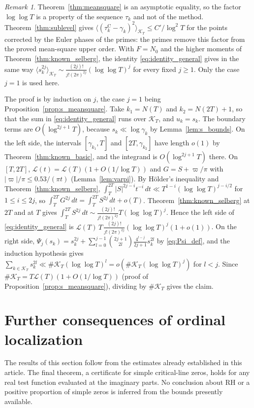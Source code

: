\documentclass[11pt,a4paper]{article}
\makeatletter
\numberwithin{equation}{section}
\DeclareRobustCommand{\CGref}[1]{\ref{#1}}
\DeclareRobustCommand{\CGeqref}[1]{\eqref{#1}}
\let\CG@origref\ref
\let\CG@origeqref\eqref
\newcommand{\CG@gettip}[1]{\@ifundefined{CGTip@#1}{#1}{\csname CGTip@#1\endcsname}}
\DeclareRobustCommand{\CGref}[1]{\pdftooltip{\CG@origref{#1}}{\CG@gettip{#1}}}
\DeclareRobustCommand{\CGeqref}[1]{\pdftooltip{\CG@origeqref{#1}}{\CG@gettip{#1}}}
\theoremstyle{definition}
\theoremstyle{remark}
\newtheorem{remark}[theorem]{Remark}
\newcommand{\Nz}{N_0} %
\newcommand{\lL}{\mathcal L}
\newcommand{\Kc}{\mathcal K}
\makeatother
\begin{document}
\begin{remark}\label{rem:meansquare_comparison}
Theorem~\CGref{thm:meansquare} is an asymptotic equality, so the factor $\log\log T$ is a property of the sequence $\tau_k$ and not of the method. Theorem~\CGref{thm:sublevel} gives $\langle(\tau_{k}^{\mathrm C}-\gamma_k)^2\rangle_{\Kc_T}\le C'/\log^2T$ for the points corrected by the Euler phases of the primes: the primes remove this factor from the proved mean-square upper order. With $F=\Nz$ and the higher moments of Theorem~\CGref{thm:known_selberg}, the identity \CGeqref{eq:identity_general} gives in the same way $\langle s_k^{2j}\rangle_{\Kc_T}\sim\frac{(2j)!}{j!(2\pi)^{2j}}(\log\log T)^j$ for every fixed $j\ge1$. Only the case $j=1$ is used here.

The proof is by induction on $j$, the case $j=1$ being Proposition~\CGref{prop:s_meansquare}. Take $k_1=N(T)$ and $k_2=N(2T)+1$, so that the sum in \CGeqref{eq:identity_general} runs over $\Kc_T$, and $u_k=s_k$. The boundary terms are $O(\log^{2j+1}T)$, because $s_k\ll\log\gamma_k$ by Lemma~\CGref{lem:s_bounds}. On the left side, the intervals $[\gamma_{k_1},T]$ and $[2T,\gamma_{k_2}]$ have length $o(1)$ by Theorem~\CGref{thm:known_basic}, and the integrand is $O(\log^{2j+1}T)$ there. On $[T,2T]$, $\lL(t)=\lL(T)(1+O(1/\log T))$ and $G=S+\varpi/\pi$ with $|\varpi|/\pi\le0.53/(\pi t)$ (Lemma~\CGref{lem:varpi}). By Hölder's inequality and Theorem~\CGref{thm:known_selberg}, $\int_T^{2T}|S|^{2j-i}t^{-i}\,dt\ll T^{1-i}(\log\log T)^{j-i/2}$ for $1\le i\le2j$, so $\int_T^{2T}G^{2j}\,dt=\int_T^{2T}S^{2j}\,dt+o(T)$. Theorem~\CGref{thm:known_selberg} at $2T$ and at $T$ gives $\int_T^{2T}S^{2j}\,dt\sim\frac{(2j)!}{j!(2\pi)^{2j}}T(\log\log T)^j$. Hence the left side of \CGeqref{eq:identity_general} is $\lL(T)\,T\,\frac{(2j)!}{j!(2\pi)^{2j}}(\log\log T)^j(1+o(1))$. On the right side, $\Psi_j(s_k)=s_k^{2j}+\sum_{l=0}^{j-1}\binom{2j+1}{2l}\frac{4^{l-j}}{2j+1}s_k^{2l}$ by \CGeqref{eq:Psi_def}, and the induction hypothesis gives $\sum_{k\in\Kc_T}s_k^{2l}\ll\#\Kc_T(\log\log T)^l=o(\#\Kc_T(\log\log T)^j)$ for $l<j$. Since $\#\Kc_T=T\lL(T)(1+O(1/\log T))$ (proof of Proposition~\CGref{prop:s_meansquare}), dividing by $\#\Kc_T$ gives the claim.
\end{remark}


\section{Further consequences of ordinal localization}\label{sec:additional}
The results of this section follow from the estimates already established in this article. The final theorem, a certificate for simple critical-line zeros, holds for any real test function evaluated at the imaginary parts. No conclusion about RH or a positive proportion of simple zeros is inferred from the bounds presently available.
\end{document}
